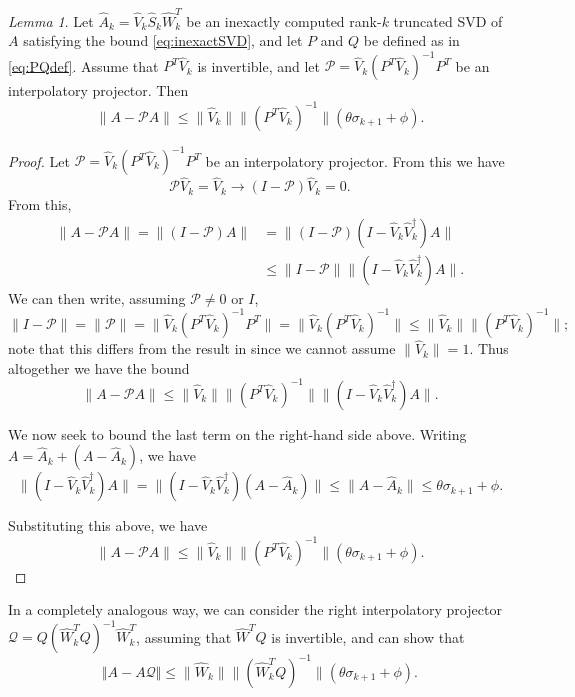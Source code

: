 \documentclass[12pt, a4paper]{article}
\newcommand{\What}{\widehat{W}}
\newcommand{\Shat}{\widehat{S}}
\newcommand{\Vhat}{\widehat{V}}
\newcommand{\E}{\theta}
\newcommand{\F}{\phi}
\def\norm#1{\|#1\|}
\theoremstyle{remark}
\newtheorem{lemma}[theorem]{Lemma}
\begin{document}
\begin{lemma}
Let $\widehat{A}_k = \Vhat_k \Shat_k \What_k^T$ be an inexactly computed rank-$k$ truncated SVD of $A$ satisfying the bound \eqref{eq:inexactSVD}, and let $P$ and $Q$ be defined as in \eqref{eq:PQdef}.
Assume that $P^T\Vhat_k$ is invertible, and let $\mathcal{P}=\Vhat_k(P^T\Vhat_k)^{-1}P^T$ be an interpolatory projector. Then 
%
\begin{equation*}
\norm{A-\mathcal{P}A} \leq \norm{\Vhat_k} \norm{(P^T\Vhat_k)^{-1}} (\E\sigma_{k+1}+\F).
\end{equation*}

\end{lemma}
\begin{proof}
    
 Let $\mathcal{P}=\Vhat_k(P^T\Vhat_k)^{-1}P^T$ be an interpolatory projector. From this we have
\[
\mathcal{P}\Vhat_k = \Vhat_k \rightarrow (I-\mathcal{P})\Vhat_k = 0.
\]
From this,
\begin{align*}
\norm{A-\mathcal{P}A} = \norm{(I-\mathcal{P})A} &= \norm{(I-\mathcal{P})(I-\Vhat_k \Vhat_k^\dagger)A} \\
&\leq \norm{I-\mathcal{P}} \norm{(I-\Vhat_k \Vhat_k^\dagger)A}.
\end{align*}
We can then write, assuming $\mathcal{P}\neq 0$ or $I$,
\[
\norm{I-\mathcal{P}} = \norm{\mathcal{P}} = \norm{\Vhat_k (P^T\Vhat_k)^{-1}P^T} = \norm{\Vhat_k (P^T\Vhat_k)^{-1}} \leq \norm{\Vhat_k}\norm{(P^T \Vhat_k)^{-1}};
\]
note that this differs from the result in \cite[Lemma 4.1]{sorensen2016deim} since we cannot assume $\norm{\Vhat_k}=1$.
Thus altogether we have the bound
\[
\norm{A-\mathcal{P}A} \leq \norm{\Vhat_k} \norm{(P^T\Vhat_k)^{-1}} \norm{(I-\Vhat_k\Vhat_k^\dagger)A}.
\]

We now seek to bound the last term on the right-hand side above. Writing $A = \widehat{A}_k + (A-\widehat{A}_k)$, we have
\begin{equation}
    \norm{(I-\Vhat_k\Vhat_k^\dagger)A} = \norm{(I-\Vhat_k \Vhat_k^\dagger)(A-\widehat{A}_k)} \leq \norm{A-\widehat{A}_k} \leq \E\sigma_{k+1} + \F.
\end{equation}



Substituting this above, we have 
\[
\norm{A-\mathcal{P}A} \leq \norm{\Vhat_k} \norm{(P^T\Vhat_k)^{-1}} (\E\sigma_{k+1}+\F).
\]

\end{proof}

In a completely analogous way, we can consider the right interpolatory projector $\mathcal{Q} = Q(\What_k^TQ)^{-1}\What_k^T$, assuming that $\What^TQ$ is invertible, and can show that 
\begin{equation}
    \Vert A - A\mathcal{Q}\Vert \leq \norm{\What_k}\norm{(\What_k^T Q)^{-1}}(\E\sigma_{k+1}+\F).
\end{equation}
\end{document}
